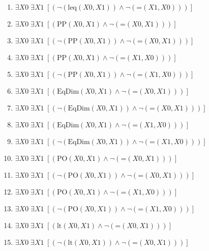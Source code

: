 \documentclass{article}
\begin{document}
\begin{enumerate}
\item $\exists X0\; \exists X1\;  \left[ \left(\neg \left(\textrm{leq}(X0,X1)\right) \land \neg \left(\textrm{=}(X1,X0)\right)\right) \right]$
\item $\exists X0\; \exists X1\;  \left[ \left(\textrm{PP}(X0,X1) \land \neg \left(\textrm{=}(X0,X1)\right)\right) \right]$
\item $\exists X0\; \exists X1\;  \left[ \left(\neg \left(\textrm{PP}(X0,X1)\right) \land \neg \left(\textrm{=}(X0,X1)\right)\right) \right]$
\item $\exists X0\; \exists X1\;  \left[ \left(\textrm{PP}(X0,X1) \land \neg \left(\textrm{=}(X1,X0)\right)\right) \right]$
\item $\exists X0\; \exists X1\;  \left[ \left(\neg \left(\textrm{PP}(X0,X1)\right) \land \neg \left(\textrm{=}(X1,X0)\right)\right) \right]$
\item $\exists X0\; \exists X1\;  \left[ \left(\textrm{EqDim}(X0,X1) \land \neg \left(\textrm{=}(X0,X1)\right)\right) \right]$
\item $\exists X0\; \exists X1\;  \left[ \left(\neg \left(\textrm{EqDim}(X0,X1)\right) \land \neg \left(\textrm{=}(X0,X1)\right)\right) \right]$
\item $\exists X0\; \exists X1\;  \left[ \left(\textrm{EqDim}(X0,X1) \land \neg \left(\textrm{=}(X1,X0)\right)\right) \right]$
\item $\exists X0\; \exists X1\;  \left[ \left(\neg \left(\textrm{EqDim}(X0,X1)\right) \land \neg \left(\textrm{=}(X1,X0)\right)\right) \right]$
\item $\exists X0\; \exists X1\;  \left[ \left(\textrm{PO}(X0,X1) \land \neg \left(\textrm{=}(X0,X1)\right)\right) \right]$
\item $\exists X0\; \exists X1\;  \left[ \left(\neg \left(\textrm{PO}(X0,X1)\right) \land \neg \left(\textrm{=}(X0,X1)\right)\right) \right]$
\item $\exists X0\; \exists X1\;  \left[ \left(\textrm{PO}(X0,X1) \land \neg \left(\textrm{=}(X1,X0)\right)\right) \right]$
\item $\exists X0\; \exists X1\;  \left[ \left(\neg \left(\textrm{PO}(X0,X1)\right) \land \neg \left(\textrm{=}(X1,X0)\right)\right) \right]$
\item $\exists X0\; \exists X1\;  \left[ \left(\textrm{lt}(X0,X1) \land \neg \left(\textrm{=}(X0,X1)\right)\right) \right]$
\item $\exists X0\; \exists X1\;  \left[ \left(\neg \left(\textrm{lt}(X0,X1)\right) \land \neg \left(\textrm{=}(X0,X1)\right)\right) \right]$

\end{enumerate}
\end{document}
